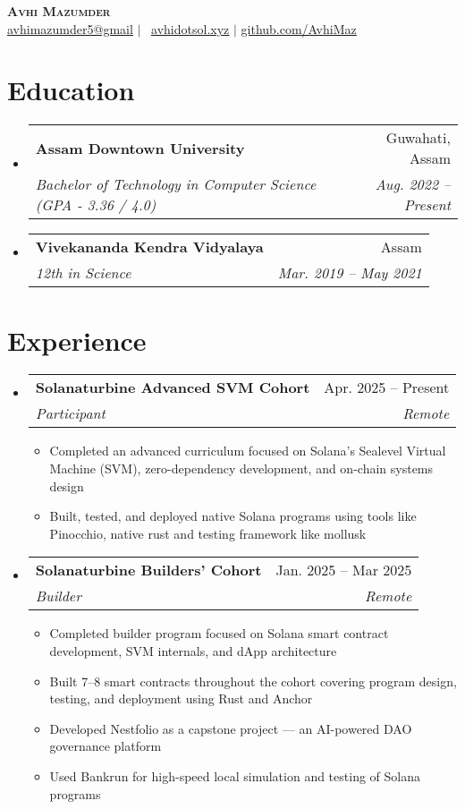 \documentclass[letterpaper,11pt]{article}
\makeatletter
\newcommand{\resumeItem}[1]{
  \item\small{
    {#1 \vspace{-2pt}}
  }
}
\newcommand{\resumeSubheading}[4]{
  \vspace{-2pt}\item
    \begin{tabular*}{0.97\textwidth}[t]{l@{\extracolsep{\fill}}r}
      \textbf{#1} & #2 \\
      \textit{\small#3} & \textit{\small #4} \\
    \end{tabular*}\vspace{-7pt}
}
\newcommand{\resumeSubHeadingListStart}{\begin{itemize}[leftmargin=0.15in, label={}]}
\newcommand{\resumeSubHeadingListEnd}{\end{itemize}}
\newcommand{\resumeItemListStart}{\begin{itemize}}
\newcommand{\resumeItemListEnd}{\end{itemize}\vspace{-5pt}}
\makeatother
\begin{document}
\begin{center}
    \textbf{\Huge \scshape Avhi Mazumder} \\ \vspace{1pt}
    \small\href{mailto:avhimazumder5@gmail.com}{\underline{avhimazumder5@gmail}} $|$ \
    \href{https://avhidotsol.xyz/}{\underline{avhidotsol.xyz}} $|$
    \href{https://github.com/AvhiMaz}{\underline{github.com/AvhiMaz}}
\end{center}


\section{Education}
  \resumeSubHeadingListStart
    \resumeSubheading
      {Assam Downtown University}{Guwahati, Assam}
      {Bachelor of Technology in Computer Science (GPA - 3.36 / 4.0)}{Aug. 2022 -- Present}
    \resumeSubheading
      {Vivekananda Kendra Vidyalaya}{Assam}
      {12th in Science}{Mar. 2019 -- May 2021}
  \resumeSubHeadingListEnd


\section{Experience}
  \resumeSubHeadingListStart

    \resumeSubheading
      {Solanaturbine Advanced SVM Cohort}{Apr. 2025 -- Present}
      {Participant}{Remote}
      \resumeItemListStart
        \resumeItem{Completed an advanced curriculum focused on Solana's Sealevel Virtual Machine (SVM), zero-dependency development, and on-chain systems design}
        \resumeItem{Built, tested, and deployed native Solana programs using tools like Pinocchio, native rust and testing framework like mollusk}
      \resumeItemListEnd
    \resumeSubheading
      {Solanaturbine Builders' Cohort}{Jan. 2025 -- Mar 2025}
      {Builder}{Remote}
    \resumeItemListStart
      \resumeItem{Completed builder program focused on Solana smart contract development, SVM internals, and dApp architecture}
      \resumeItem{Built 7–8 smart contracts throughout the cohort covering program design, testing, and deployment using Rust and Anchor}
      \resumeItem{Developed Nestfolio as a capstone project — an AI-powered DAO governance platform}
      \resumeItem{Used Bankrun for high-speed local simulation and testing of Solana programs}
    \resumeItemListEnd
  \resumeSubHeadingListEnd


\end{document}

